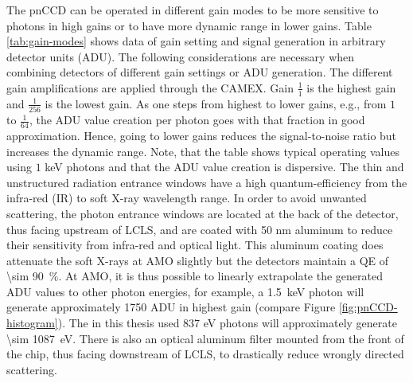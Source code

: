The pnCCD can be operated in different gain modes to be more sensitive to photons in high gains or to have more dynamic range in lower gains. Table \ref{tab:gain-modes} shows data of gain setting and signal generation in arbitrary detector units (ADU). The following considerations are necessary when combining detectors of different gain settings or ADU generation. The different gain amplifications are applied through the CAMEX. Gain $\tfrac{1}{1}$ is the highest gain and $\tfrac{1}{256}$ is the lowest gain. As one steps from highest to lower gains, e.g., from $1$ to $\tfrac{1}{64}$, the ADU value creation per photon goes with that fraction in good approximation. Hence, going to lower gains reduces the signal-to-noise ratio but increases the dynamic range. Note, that the table shows typical operating values using $1$ keV photons and that the ADU value creation is dispersive. The thin and unstructured radiation entrance windows have a high quantum-efficiency from the infra-red (IR) to soft X-ray wavelength range. In order to avoid unwanted scattering, the photon entrance windows are located at the back of the detector, thus facing upstream of LCLS, and are coated with 50 nm aluminum to reduce their sensitivity from infra-red and optical light. This aluminum coating does attenuate the soft X-rays at AMO slightly but the detectors maintain a QE of \SI{\sim 90}{\percent}. At AMO, it is thus possible to linearly extrapolate the generated ADU values to other photon energies, for example, a \SI{1.5}{\kilo\electronvolt} photon will generate approximately 1750 ADU in highest gain (compare Figure \ref{fig:pnCCD-histogram}). The in this thesis used 837 eV photons will approximately generate \SI{\sim 1087}{\electronvolt}. There is also an optical aluminum filter mounted from the front of the chip, thus facing downstream of LCLS, to drastically reduce wrongly directed scattering.
%
%
%
